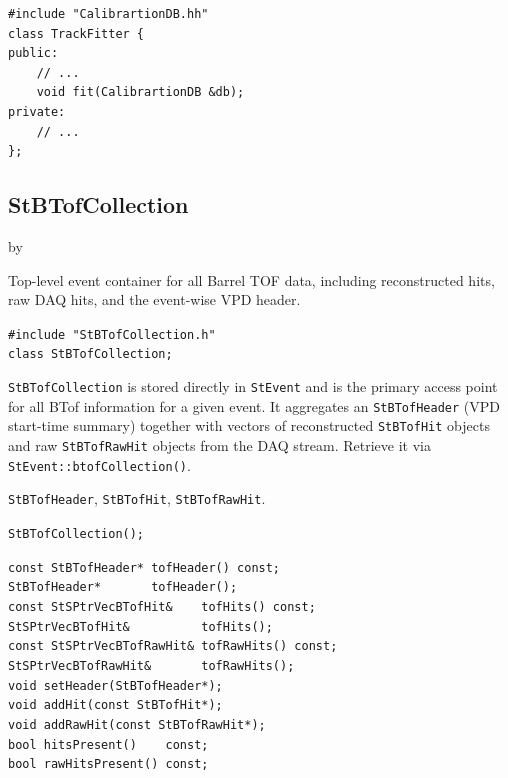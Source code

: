 \documentclass[twoside]{article}
\newcommand{\entrylabel}[1]{\mbox{\textbf{{#1}}}\hfil}%
\newenvironment{entry}
{\begin{list}{}%
    {\renewcommand{\makelabel}{\entrylabel}%
     \setlength{\labelwidth}{90pt}%
     \setlength{\leftmargin}{\labelwidth}
     \advance\leftmargin by \labelsep%
      }%
    }%
  {\end{list}}
\newcommand{\Entrylabel}[1]%
{\raisebox{0pt}[1ex][0pt]{\makebox[\labelwidth][l]%
    {\parbox[t]{\labelwidth}{\hspace{0pt}\textbf{{#1}}}}}}
\newenvironment{Entry}%
{\renewcommand{\entrylabel}{\Entrylabel}\begin{entry}}%
  {\end{entry}}
\begin{document}
{\footnotesize
\begin{verbatim}
#include "CalibrartionDB.hh"
class TrackFitter {
public:
    // ...
    void fit(CalibrartionDB &db);
private:
    // ...
};
\end{verbatim}
}%

%
%

\subsection{StBTofCollection}
\label{sec:StBTofCollection}
\begin{Entry}
\item[Summary] Top-level event container for all Barrel TOF data, including reconstructed
    hits, raw DAQ hits, and the event-wise VPD header.
\item[Synopsis]
    \verb+#include "StBTofCollection.h"+\\
    \verb+class StBTofCollection;+\\
\item[Description]
    \texttt{StBTofCollection} is stored directly in \texttt{StEvent} and is the
    primary access point for all BTof information for a given event.
    It aggregates an \texttt{StBTofHeader} (VPD start-time summary) together with
    vectors of reconstructed \texttt{StBTofHit} objects and raw
    \texttt{StBTofRawHit} objects from the DAQ stream.
    Retrieve it via \verb+StEvent::btofCollection()+.
\item[Related Classes]
    \texttt{StBTofHeader}, \texttt{StBTofHit}, \texttt{StBTofRawHit}.
\item[Public\\ Constructors]
    \verb+StBTofCollection();+\\
\item[Public Member\\ Functions]
    \verb+const StBTofHeader* tofHeader() const;+\\
    \verb+StBTofHeader*       tofHeader();+\\

    \verb+const StSPtrVecBTofHit&    tofHits() const;+\\
    \verb+StSPtrVecBTofHit&          tofHits();+\\

    \verb+const StSPtrVecBTofRawHit& tofRawHits() const;+\\
    \verb+StSPtrVecBTofRawHit&       tofRawHits();+\\

    \verb+void setHeader(StBTofHeader*);+\\
    \verb+void addHit(const StBTofHit*);+\\
    \verb+void addRawHit(const StBTofRawHit*);+\\

    \verb+bool hitsPresent()    const;+\\
    \verb+bool rawHitsPresent() const;+\\
\end{Entry}
\clearpage
\end{document}
